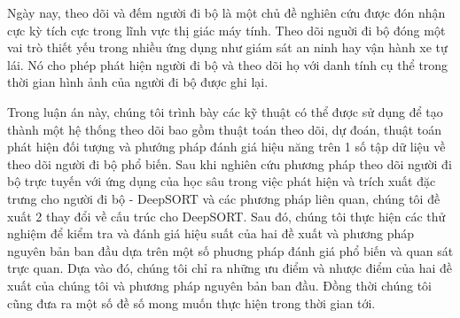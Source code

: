 \begin{vnabstract}
\hspace{0.45cm}Ngày nay, theo dõi và đếm người đi bộ là một chủ đề nghiên cứu được đón nhận cực kỳ tích cực trong lĩnh vực thị giác máy tính. 
Theo dõi nguời đi bộ đóng một vai trò thiết yếu trong nhiều ứng dụng như giám sát an ninh hay vận hành xe tự lái. 
Nó cho phép phát hiện người đi bộ và theo dõi họ với danh tính cụ thể trong thời gian hình ảnh của người đi bộ được ghi lại.
\par Trong luận án này, chúng tôi trình bày các kỹ thuật có thể được sử dụng để tạo thành một hệ thống theo dõi bao gồm
thuật toán theo dõi, dự đoán, thuật toán phát hiện đối tượng và phướng pháp đánh giá hiệu năng trên 1 số tập dữ liệu về theo dõi người đi bộ phổ biến.
Sau khi nghiên cứu phương pháp theo dõi người đi bộ trực tuyến với ứng dụng của học sâu trong việc phát hiện và trích xuất đặc trưng cho người đi bộ
- DeepSORT và các phương pháp liên quan, chúng tôi đề xuất 2 thay đổi về cấu trúc cho DeepSORT. Sau đó, chúng tôi thực hiện các thử nghiệm để kiểm tra và đánh giá hiệu suất của hai đề xuất và
 phương pháp nguyên bản ban đầu dựa trên một số phuơng pháp đánh giá phổ biến và quan sát trực quan.
 Dựa vào đó, chúng tôi chỉ ra những ưu điểm và nhược điểm của hai đề xuất của chúng tôi và phương pháp nguyên bản ban đầu. Đồng thời chúng tôi cũng đưa ra một số đề số mong muốn thực hiện trong thời gian tới.




\end{vnabstract}